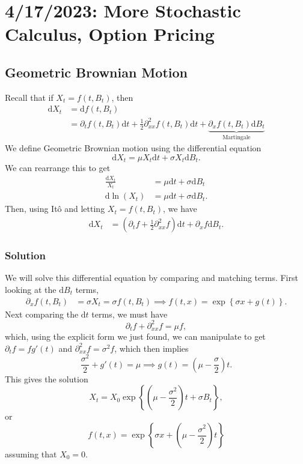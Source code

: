 \chapter{4/17/2023: More Stochastic Calculus, Option Pricing}
\section{Geometric Brownian Motion}
Recall that if $X_t = f(t,B_t)$, then \begin{align*}
	\mathrm dX_t &= \mathrm df(t,B_t) \\
				 &= \partial_t f(t,B_t)\mathrm dt + \frac{1}{2}\partial_{xx}^2 f(t,B_t)\mathrm dt + \underbrace{\partial_x f(t,B_t)\mathrm dB_t}_{\text{Martingale}}
\end{align*} We define Geometric Brownian motion using the differential equation $$ \mathrm dX_t = \mu X_t \mathrm dt + \sigma X_t \mathrm dB_t. $$ We can rearrange this to get \begin{align*}
	\frac{\mathrm dX_t}{X_t} &= \mu\mathrm dt + \sigma\mathrm dB_t \\
	\mathrm d\ln(X_t) &= \mu\mathrm dt + \sigma\mathrm dB_t.
\end{align*} Then, using It\^{o} and letting $X_t = f(t,B_t)$, we have \begin{align*}
	\mathrm dX_t &= \left( \partial_t f + \frac{1}{2}\partial_{xx}^2 f \right) \mathrm dt + \partial_x f\mathrm dB_t.
\end{align*} 
\subsection{Solution}
We will solve this differential equation by comparing and matching terms. First looking at the $\mathrm dB_t$ terms, \begin{align*}
	\partial_x f(t,B_t) &= \sigma X_t = \sigma f(t,B_t) 
	\implies f(t,x) = \exp \left\{ \sigma x + g(t) \right\}.
\end{align*} Next comparing the $\mathrm dt$ terms, we must have $$ \partial_t f + \partial_{xx}^2 f = \mu f, $$ which, using the explicit form we just found, we can manipulate to get $\partial_t f = f g'(t)$ and $\partial_{xx}^2 f = \sigma^2 f$, which then implies $$ \frac{\sigma^2}{2} + g'(t) = \mu \implies g(t) = \left(\mu-\frac{\sigma}{2}\right)t. $$ This gives the solution $$ X_t = X_0 \exp \left\{ \left( \mu-\frac{\sigma^2}{2} \right) t + \sigma B_t \right\}, $$ or $$ f(t,x) = \exp \left\{ \sigma x + \left( \mu-\frac{\sigma^2}{2} \right) t \right\} $$ assuming that $X_0 = 0$.

